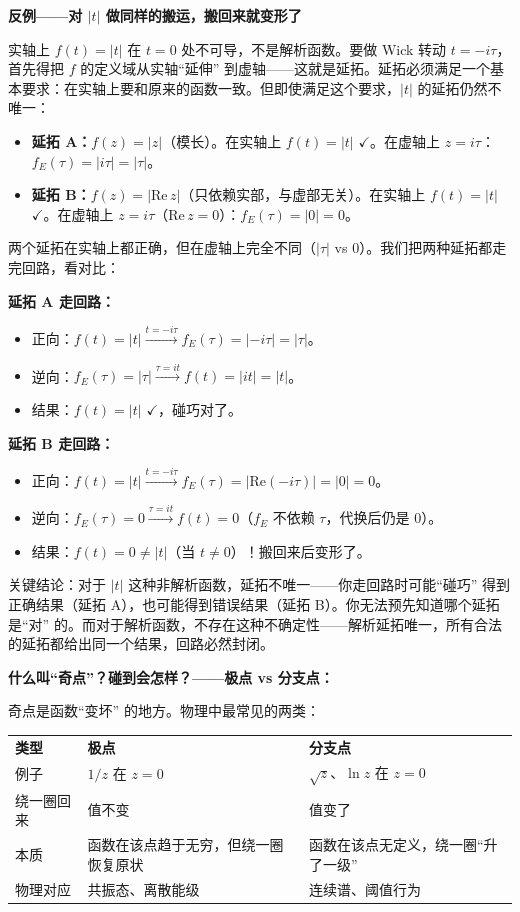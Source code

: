 \begin{derivationbox}[解析延拓与积分路径的选择]
\textbf{反例——对 $|t|$ 做同样的搬运，搬回来就变形了}

实轴上 $f(t) = |t|$ 在 $t = 0$ 处不可导，不是解析函数。要做 Wick 转动 $t = -i\tau$，首先得把 $f$ 的定义域从实轴``延伸'' 到虚轴——这就是延拓。延拓必须满足一个基本要求：在实轴上要和原来的函数一致。但即使满足这个要求，$|t|$ 的延拓仍然不唯一：
\begin{itemize}
    \item \textbf{延拓 A：}$f(z) = |z|$（模长）。在实轴上 $f(t) = |t|$ $\checkmark$。在虚轴上 $z = i\tau$：$f_E(\tau) = |i\tau| = |\tau|$。
    \item \textbf{延拓 B：}$f(z) = |\text{Re}\, z|$（只依赖实部，与虚部无关）。在实轴上 $f(t) = |t|$ $\checkmark$。在虚轴上 $z = i\tau$（$\text{Re}\, z = 0$）：$f_E(\tau) = |0| = 0$。
\end{itemize}
两个延拓在实轴上都正确，但在虚轴上完全不同（$|\tau|$ vs $0$）。我们把两种延拓都走完回路，看对比：

\textbf{延拓 A 走回路：}
\begin{itemize}
    \item 正向：$f(t) = |t| \xrightarrow{t = -i\tau} f_E(\tau) = |-i\tau| = |\tau|$。
    \item 逆向：$f_E(\tau) = |\tau| \xrightarrow{\tau = it} f(t) = |it| = |t|$。
    \item 结果：$f(t) = |t|$ $\checkmark$，碰巧对了。
\end{itemize}

\textbf{延拓 B 走回路：}
\begin{itemize}
    \item 正向：$f(t) = |t| \xrightarrow{t = -i\tau} f_E(\tau) = |\text{Re}(-i\tau)| = |0| = 0$。
    \item 逆向：$f_E(\tau) = 0 \xrightarrow{\tau = it} f(t) = 0$（$f_E$ 不依赖 $\tau$，代换后仍是 0）。
    \item 结果：$f(t) = 0 \neq |t|$（当 $t \neq 0$）！搬回来后变形了。
\end{itemize}

关键结论：对于 $|t|$ 这种非解析函数，延拓不唯一——你走回路时可能``碰巧'' 得到正确结果（延拓 A），也可能得到错误结果（延拓 B）。你无法预先知道哪个延拓是``对'' 的。而对于解析函数，不存在这种不确定性——解析延拓唯一，所有合法的延拓都给出同一个结果，回路必然封闭。

\textbf{什么叫``奇点''？碰到会怎样？——极点 vs 分支点：}

奇点是函数``变坏'' 的地方。物理中最常见的两类：

\begin{tabular}{lll}
\textbf{类型} & \textbf{极点} & \textbf{分支点} \\
例子 & $1/z$ 在 $z = 0$ & $\sqrt{z}$、$\ln z$ 在 $z = 0$ \\
绕一圈回来 & 值不变 & 值变了 \\
本质 & 函数在该点趋于无穷，但绕一圈恢复原状 & 函数在该点无定义，绕一圈``升了一级'' \\
物理对应 & 共振态、离散能级 & 连续谱、阈值行为 \\
\end{tabular}


\end{derivationbox}
